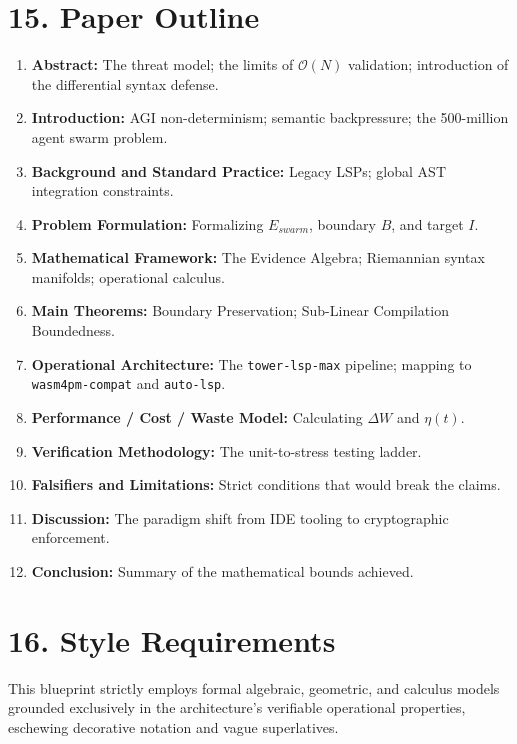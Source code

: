 \section{15. Paper Outline}
\begin{enumerate}
    \item \textbf{Abstract:} The threat model; the limits of $\mathcal{O}(N)$ validation; introduction of the differential syntax defense.
    \item \textbf{Introduction:} AGI non-determinism; semantic backpressure; the 500-million agent swarm problem.
    \item \textbf{Background and Standard Practice:} Legacy LSPs; global AST integration constraints.
    \item \textbf{Problem Formulation:} Formalizing $E_{swarm}$, boundary $B$, and target $I$.
    \item \textbf{Mathematical Framework:} The Evidence Algebra; Riemannian syntax manifolds; operational calculus.
    \item \textbf{Main Theorems:} Boundary Preservation; Sub-Linear Compilation Boundedness.
    \item \textbf{Operational Architecture:} The \texttt{tower-lsp-max} pipeline; mapping to \texttt{wasm4pm-compat} and \texttt{auto-lsp}.
    \item \textbf{Performance / Cost / Waste Model:} Calculating $\Delta W$ and $\eta(t)$.
    \item \textbf{Verification Methodology:} The unit-to-stress testing ladder.
    \item \textbf{Falsifiers and Limitations:} Strict conditions that would break the claims.
    \item \textbf{Discussion:} The paradigm shift from IDE tooling to cryptographic enforcement.
    \item \textbf{Conclusion:} Summary of the mathematical bounds achieved.
\end{enumerate}

\section{16. Style Requirements}
This blueprint strictly employs formal algebraic, geometric, and calculus models grounded exclusively in the architecture's verifiable operational properties, eschewing decorative notation and vague superlatives.

